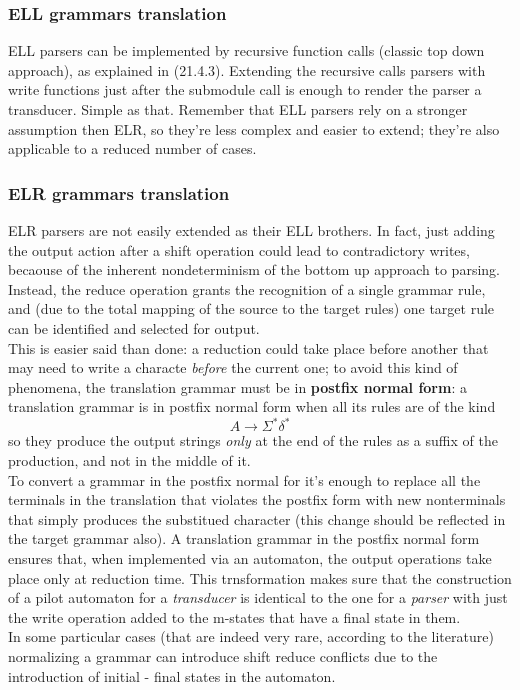 \documentclass[10pt,a4paper]{article}
\begin{document}
				\subsubsection{ELL grammars translation}
					ELL parsers can be implemented by recursive function calls (classic top down approach), as explained in (21.4.3). Extending the recursive calls parsers with write functions just after the submodule call is enough to render the parser a transducer. Simple as that. Remember that ELL parsers rely on a stronger assumption then ELR, so they're less complex and easier to extend; they're also applicable to a reduced number of cases.
				
				\subsubsection{ELR grammars translation}
					ELR parsers are not easily extended as their ELL brothers. In fact, just adding the output action after a shift operation could lead to contradictory writes, becaouse of the inherent nondeterminism of the bottom up approach to parsing. Instead, the reduce operation grants the recognition of a single grammar rule, and (due to the total mapping of the source to the target rules) one target rule can be identified and selected for output.\\
					This is easier said than done: a reduction could take place before another that may need to write a characte \emph{before} the current one; to avoid this kind of phenomena, the translation grammar must be in \textbf{postfix normal form}: a translation grammar is in postfix normal form when all its rules are of the kind
					\begin{equation}
						A \rightarrow \Sigma^\ast \delta^\ast
					\end{equation} 
					so they produce the output strings \emph{only} at the end of the rules as a suffix of the production, and not in the middle of it.\\
					To convert a grammar in the postfix normal for it's enough to replace all the terminals in the translation that violates the postfix form with new nonterminals that simply produces the substitued character (this change should be reflected in the target grammar also). A translation grammar in the postfix normal form ensures that, when implemented via an automaton, the output operations take place only at reduction time. This trnsformation makes sure that the construction of a pilot automaton for a \emph{transducer} is identical to the one for a \emph{parser} with just the write operation added to the m-states that have a final state in them.\\
					In some particular cases (that are indeed very rare, according to the literature) normalizing a grammar can introduce shift reduce conflicts due to the introduction of initial - final states in the automaton.
				
\end{document}
